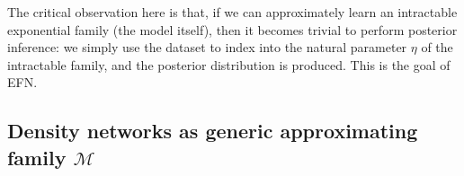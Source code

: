 \documentclass{article}
\begin{document}
The critical observation here is that, if we can approximately learn an intractable exponential family (the model itself), then it becomes trivial to perform posterior inference: we simply use the dataset to index into the natural parameter $\eta$ of the intractable family, and the posterior distribution is produced.  This is the goal of EFN.

%


 \subsection{Density networks as generic approximating family $\mathcal{M}$}
\end{document}
